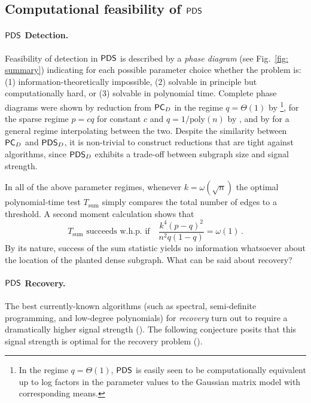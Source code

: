 \documentclass[final,12pt]{colt2023} %
\newcommand\1[1]{\mathbb{I}_{\left\{#1\right\}}}
\begin{document}
\subsection{Computational feasibility of $\mathsf{PDS}$} 
\paragraph{$\mathsf{PDS}$ Detection.} Feasibility of detection in $\mathsf{PDS}$ is described by a \emph{phase diagram} (see Fig.~\ref{fig: summary}) indicating for each possible parameter choice whether the problem is: (1) information-theoretically impossible, (2) solvable in principle but computationally hard, or (3) solvable in polynomial time.
Complete phase diagrams were shown by reduction from $\mathsf{PC}_D$ in the regime $q=\Theta(1)$ by \cite{MaWu}\footnote{In the regime $q=\Theta(1)$, $\mathsf{PDS}$ is easily seen to be computationally equivalent up to log factors in the parameter values to the Gaussian matrix model with corresponding means.},
for the sparse regime $p=cq$ for constant $c$ and $q=1/\mathrm{poly}(n)$ by \cite{HWX15}, and by \cite{BBH18} for a general regime interpolating between the two. 
Despite the similarity between $\mathsf{PC}_D$ and $\mathsf{PDS}_D$, it is non-trivial to construct reductions that are tight against algorithms, since $\mathsf{PDS}_D$ exhibits a trade-off between subgraph size and signal strength.

In all of the above parameter regimes, whenever $k=\omega(\sqrt{n})$ the optimal polynomial-time test $T_\mathrm{sum}$ simply compares the total number of edges to a threshold. A second moment calculation shows that
$$
T_\mathrm{sum}\text{ succeeds w.h.p. if}\quad \frac{k^4(p-q)^2}{n^2q(1-q)}=\omega(1)\,.
$$
By its nature, success of the sum statistic yields no information whatsoever about the location of the planted dense subgraph. What can be said about recovery?


\label{sec: recovhard}
\paragraph{$\mathsf{PDS}$ Recovery.}
The best currently-known algorithms (such as spectral, semi-definite programming, and low-degree polynomials) for \emph{recovery} 
turn out to require a dramatically higher signal strength (\cite{CX14,HWX16}). 
The following conjecture posits that this signal strength is optimal for the recovery problem (\cite{CX14,HWX15}). 
\end{document}
